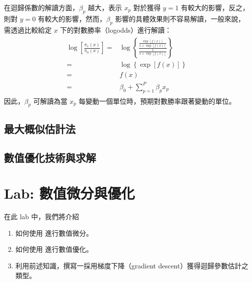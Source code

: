 \documentclass[letterpaper,10pt,english]{sphinxmanual}
\begin{document}
在迴歸係數的解讀方面，\(\beta_p\) 越大，表示 \(x_p\) 對於獲得 \(y=1\) 有較大的影響，反之，則對 \(y=0\) 有較大的影響，然而，\(\beta_p\) 影響的具體效果則不容易解讀，一般來說，需透過比較給定 \(x\) 下的對數勝率（log\sphinxhyphen{}odds）進行解讀：
\begin{equation*}
\begin{split}\begin{aligned}
\log \left[ \frac{\pi_1(x)}{\pi_0(x)} \right]
=& \log \left\{ \frac{\frac{\exp{ \left[ f(x) \right] }}{1+\exp{ \left[ f(x) \right] }}}{\frac{1}{1+\exp{ \left[ f(x) \right] }}} \right\} \\
=& \log \left\{ \exp \left[ f(x) \right] \right\} \\
=& f(x)  \\
=& \beta_0 + \sum_{p=1}^P \beta_p x_p
\end{aligned}\end{split}
\end{equation*}
因此，\(\beta_p\) 可解讀為當 \(x_p\) 每變動一個單位時，預期對數勝率跟著變動的單位。


\section{最大概似估計法}
\label{\detokenize{notebook/logistic-regression:id3}}

\section{數值優化技術與求解}
\label{\detokenize{notebook/logistic-regression:id4}}

\chapter{Lab: 數值微分與優化}
\label{\detokenize{notebook/lab-torch-diff-opt:lab}}\label{\detokenize{notebook/lab-torch-diff-opt::doc}}
在此 lab 中，我們將介紹
\begin{enumerate}
%
\item {} 
如何使用  進行數值微分。

\item {} 
如何使用  進行數值優化。

\item {} 
利用前述知識，撰寫一採用梯度下降（gradient descent）獲得迴歸參數估計之類型。

\end{enumerate}
\end{document}
